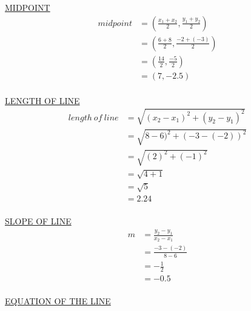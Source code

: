 \documentclass{article}
\begin{document}
\begin{description}
        \underline{MIDPOINT}
        $$
            \begin{aligned}
                midpoint & = (\frac{x_1+x_2}{2}, \frac{y_1+y_2}{2}) \\
                         & = (\frac{6+8}{2}, \frac{-2 + (-3)}{2})   \\
                         & = (\frac{14}{2}, \frac{-5}{2})           \\
                         & = (7, -2.5)                              \\
            \end{aligned}
        $$

        \underline{LENGTH OF LINE}
        $$
            \begin{aligned}
                length \ of \ line & = \sqrt{(x_2-x_1)^2 + (y_2-y_1)^2} \\
                                   & = \sqrt{8-6)^2 + (-3-(-2))^2}      \\
                                   & = \sqrt{(2)^2 + (-1)^2}            \\
                                   & = \sqrt{4 + 1}                     \\
                                   & = \sqrt{5}                         \\
                                   & = 2.24                             \\
            \end{aligned}
        $$

        \underline{SLOPE OF LINE}
        $$
            \begin{aligned}
                m & = \frac{y_2-y_1}{x_2-x_1} \\
                  & = \frac{-3-(-2)}{8-6}     \\
                  & = -\frac{1}{2}            \\
                  & = -0.5                    \\
            \end{aligned}
        $$

        \underline{EQUATION OF THE LINE}


\end{description}
\end{document}
